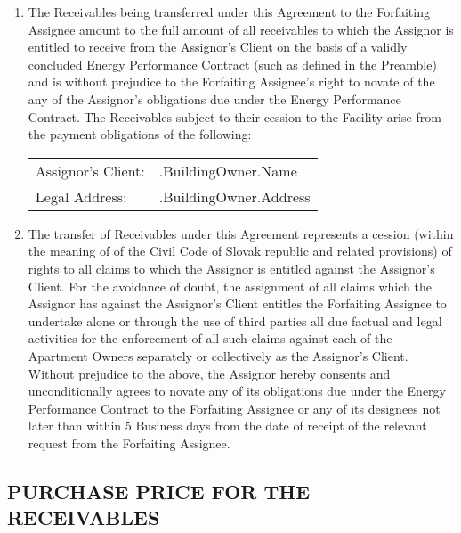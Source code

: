 \documentclass[a4paper]{article}
\begin{document}
\begin{enumerate}
\item{The Receivables being transferred under this Agreement to the
    Forfaiting Assignee amount to the full amount of all receivables
    to which the Assignor is entitled to receive from the Assignor’s
    Client on the basis of a validly concluded Energy Performance
    Contract (such as defined in the Preamble) and is without
    prejudice to the Forfaiting Assignee’s right to novate of the any
    of the Assignor’s obligations due under the Energy Performance
    Contract. The Receivables subject to their cession to the Facility
    arise from the payment obligations of the following: \par

    \begin{tabu}{XX[2]}
      Assignor’s Client:  & {{.BuildingOwner.Name}} \\
      Legal Address:      & {{.BuildingOwner.Address}}
    \end{tabu}}

\item{The transfer of Receivables under this Agreement represents a
    cession (within the meaning of of the Civil Code of Slovak republic and related provisions) of rights to
    all claims to which the Assignor is entitled against the
    Assignor’s Client. For the avoidance of doubt, the assignment of
    all claims which the Assignor has against the Assignor’s Client
    entitles the Forfaiting Assignee to undertake alone or through the
    use of third parties all due factual and legal activities for the
    enforcement of all such claims against each of the Apartment
    Owners separately or collectively as the Assignor’s
    Client. Without prejudice to the above, the Assignor hereby
    consents and unconditionally agrees to novate any of its
    obligations due under the Energy Performance Contract to the
    Forfaiting Assignee or any of its designees not later than within
    5 Business days from the date of receipt of the relevant request
    from the Forfaiting Assignee. }
\end{enumerate}

\subsection{PURCHASE PRICE FOR THE RECEIVABLES}
\end{document}
